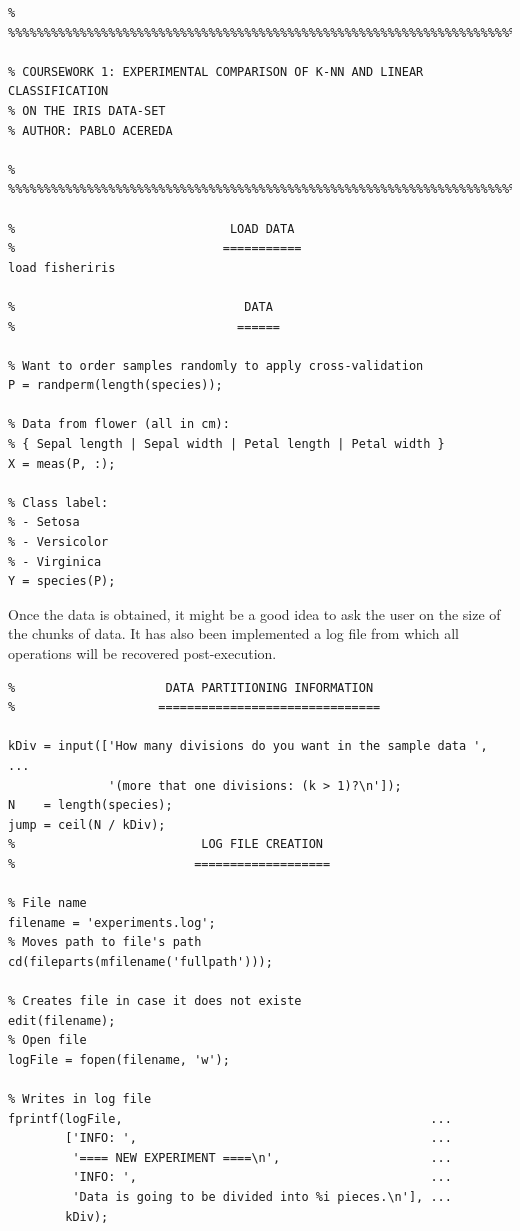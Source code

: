 \documentclass[11pt]{article}
\begin{document}
\begin{verbatim}
% %%%%%%%%%%%%%%%%%%%%%%%%%%%%%%%%%%%%%%%%%%%%%%%%%%%%%%%%%%%%%%%%%%%%%%%%%

% COURSEWORK 1: EXPERIMENTAL COMPARISON OF K-NN AND LINEAR CLASSIFICATION
% ON THE IRIS DATA-SET
% AUTHOR: PABLO ACEREDA

% %%%%%%%%%%%%%%%%%%%%%%%%%%%%%%%%%%%%%%%%%%%%%%%%%%%%%%%%%%%%%%%%%%%%%%%%%

%                              LOAD DATA
%                             ===========
load fisheriris
    
%                                DATA 
%                               ======
    
% Want to order samples randomly to apply cross-validation
P = randperm(length(species));

% Data from flower (all in cm):
% { Sepal length | Sepal width | Petal length | Petal width }
X = meas(P, :);

% Class label:
% - Setosa
% - Versicolor
% - Virginica
Y = species(P);
\end{verbatim}

Once the data is obtained, it might be a good idea to ask the user on the size
of the chunks of data. It has also been implemented a log file from which all
operations will be recovered post-execution.

\begin{verbatim}
%                     DATA PARTITIONING INFORMATION
%                    ===============================

kDiv = input(['How many divisions do you want in the sample data ', ...
              '(more that one divisions: (k > 1)?\n']);
N    = length(species);
jump = ceil(N / kDiv);
%                          LOG FILE CREATION
%                         ===================

% File name
filename = 'experiments.log';
% Moves path to file's path
cd(fileparts(mfilename('fullpath')));

% Creates file in case it does not existe
edit(filename);
% Open file 
logFile = fopen(filename, 'w');

% Writes in log file
fprintf(logFile,                                           ...
        ['INFO: ',                                         ...
         '==== NEW EXPERIMENT ====\n',                     ...
         'INFO: ',                                         ...
         'Data is going to be divided into %i pieces.\n'], ...
        kDiv);
\end{verbatim}
\end{document}
